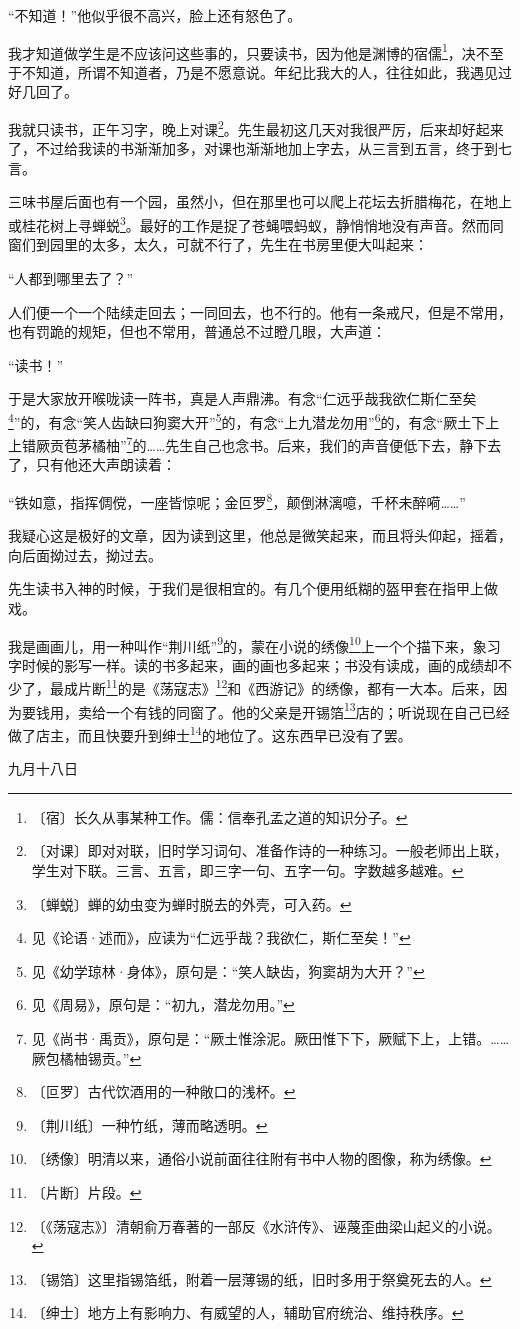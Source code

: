 \documentclass[12pt,UTF-8,openany]{ctexbook}
\begin{document}
\begin{normalsize}
    “不知道！”他似乎很不高兴，脸上还有怒色了。
    
    我才知道做学生是不应该问这些事的，只要读书，因为他是渊博的宿儒\footnote{〔宿〕长久从事某种工作。儒：信奉孔孟之道的知识分子。}，决不至于不知道，所谓不知道者，乃是不愿意说。年纪比我大的人，往往如此，我遇见过好几回了。
    
    我就只读书，正午习字，晚上对课\footnote{〔对课〕即对对联，旧时学习词句、准备作诗的一种练习。一般老师出上联，学生对下联。三言、五言，即三字一句、五字一句。字数越多越难。}。先生最初这几天对我很严厉，后来却好起来了，不过给我读的书渐渐加多，对课也渐渐地加上字去，从三言到五言，终于到七言。
    
    三味书屋后面也有一个园，虽然小，但在那里也可以爬上花坛去折腊梅花，在地上或桂花树上寻蝉蜕\footnote{〔蝉蜕〕蝉的幼虫变为蝉时脱去的外壳，可入药。}。最好的工作是捉了苍蝇喂蚂蚁，静悄悄地没有声音。然而同窗们到园里的太多，太久，可就不行了，先生在书房里便大叫起来：
    
    “人都到哪里去了？”
    
    人们便一个一个陆续走回去；一同回去，也不行的。他有一条戒尺，但是不常用，也有罚跪的规矩，但也不常用，普通总不过瞪几眼，大声道：
    
    “读书！”
    
    于是大家放开喉咙读一阵书，真是人声鼎沸。有念“仁远乎哉我欲仁斯仁至矣\footnote{见《论语·述而》，应读为“仁远乎哉？我欲仁，斯仁至矣！”}”的，有念“笑人齿缺曰狗窦大开”\footnote{见《幼学琼林·身体》，原句是：“笑人缺齿，狗窦胡为大开？”}的，有念“上九潜龙勿用”\footnote{见《周易》，原句是：“初九，潜龙勿用。”}的，有念“厥土下上上错厥贡苞茅橘柚”\footnote{见《尚书·禹贡》，原句是：“厥土惟涂泥。厥田惟下下，厥赋下上，上错。……厥包橘柚锡贡。”}的……先生自己也念书。后来，我们的声音便低下去，静下去了，只有他还大声朗读着：
    
    “铁如意，指挥倜傥，一座皆惊呢；金叵罗\footnote{〔叵罗〕古代饮酒用的一种敞口的浅杯。}，颠倒淋漓噫，千杯未醉嗬……”
    
    我疑心这是极好的文章，因为读到这里，他总是微笑起来，而且将头仰起，摇着，向后面拗过去，拗过去。
    
    先生读书入神的时候，于我们是很相宜的。有几个便用纸糊的盔甲套在指甲上做戏。
    
    我是画画儿，用一种叫作“荆川纸”\footnote{〔荆川纸〕一种竹纸，薄而略透明。}的，蒙在小说的绣像\footnote{〔绣像〕明清以来，通俗小说前面往往附有书中人物的图像，称为绣像。}上一个个描下来，象习字时候的影写一样。读的书多起来，画的画也多起来；书没有读成，画的成绩却不少了，最成片断\footnote{〔片断〕片段。}的是《荡寇志》\footnote{〔《荡寇志》〕清朝俞万春著的一部反《水浒传》、诬蔑歪曲梁山起义的小说。}和《西游记》的绣像，都有一大本。后来，因为要钱用，卖给一个有钱的同窗了。他的父亲是开锡箔\footnote{〔锡箔〕这里指锡箔纸，附着一层薄锡的纸，旧时多用于祭奠死去的人。}店的；听说现在自己已经做了店主，而且快要升到绅士\footnote{〔绅士〕地方上有影响力、有威望的人，辅助官府统治、维持秩序。}的地位了。这东西早已没有了罢。
    
    \hfill 九月十八日
    
\end{normalsize}
\end{document}
